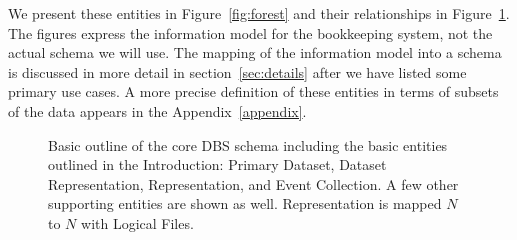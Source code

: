 \documentclass{cmspaper}
\begin{document}
We present these entities in Figure~\ref{fig:forest} and their relationships
in Figure~\ref{fig:highlevel}.  The figures express the information model
for the bookkeeping system, not the actual schema we will use.
The mapping of the information model into a schema is discussed in more
detail in section~\ref{sec:details} after we have listed some primary use
cases.  A more precise definition of these entities in terms of subsets of
the data appears in the Appendix~\ref{appendix}.

\begin{figure}[hbtp]
  \begin{center}
    \caption{Basic outline of the core DBS schema including the basic entities outlined 
in the Introduction: Primary Dataset, Dataset Representation, Representation, 
and Event Collection.  A few other supporting entities are shown as well.  Representation 
is mapped $N$ to $N$ with Logical Files. }
    \label{fig:highlevel}
  \end{center}
\end{figure}
\end{document}
